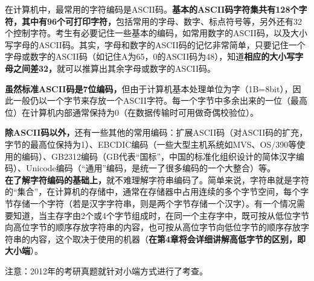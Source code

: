 在计算机中，最常用的字符编码是ASCII码。\textbf{{基本的ASCII码字符集共有128个字符，其中有96个可打印字符，}}包括常用的字母、数字、标点符号等，另外还有32个控制字符。考生有必要记住一些基本的编码，如常用数字的ASCII码，以及大小写字母的ASCII码。其实，字母和数字的ASCII码的记忆非常简单，只要记住一个字母或数字的ASCII码（如记住A为65，0的ASCII码为48），知道\textbf{相应的大小写字母之间差32，}就可以推算出其余字母或数字的ASCII码。

\textbf{虽然标准ASCII码是7位编码，}但由于计算机基本处理单位为字（1B=8bit），因此一般仍以一个字节来存放一个ASCII字符。每一个字节中多余出来的一位（最高位）在计算机内部通常保持为0（在数据传输时可用做奇偶校验位）。

\textbf{除ASCII码以外，}还有一些其他的常用编码：扩展ASCII码（对ASCII码的扩充，字节的最高位保持为1）、EBCDIC编码（一些大型主机系统如MVS、OS/390等使用的编码）、GB2312编码（GB代表``国标''，中国的标准化组织设计的简体汉字编码）、Unicode编码（``通用''编码，是统一了很多编码的一个大整合）等。\\

\textbf{在了解字符编码的基础上，}就不难理解字符串编码了。简单来说，字符串就是字符的``集合''，在计算机的存储中，通常在存储器中占用连续的多个字节空间，每个字节存储一个字符（若是汉字字符串，则是两个字节存储一个汉字）。有一个情况需要知道，当主存字由2个或4个字节组成时，在同一个主存字中，既可按从低位字节向高位字节的顺序存放字符串的内容，也可按从高位字节向低位字节的顺序存放字符串的内容，这个取决于使用的机器（\textbf{在第4章将会详细讲解高低字节的区别，即大小端}）。

{注意：2012年的考研真题就针对小端方式进行了考查。}\\
